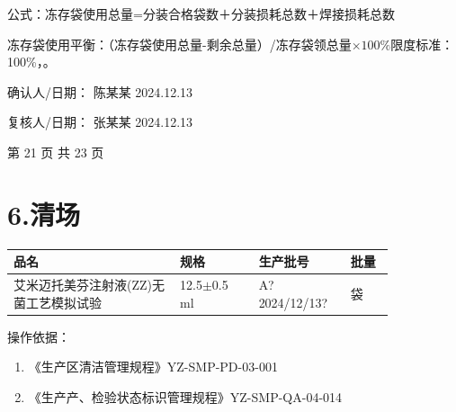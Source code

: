 \documentclass[UTF8,10pt,a4paper,fontset=fandol]{ctexart}
\newcommand{\fieldvalue}[1]{#1}
\newcommand{\handwritten}[1]{#1}
\begin{document}
公式：冻存袋使用总量=分装合格袋数＋分装损耗总数＋焊接损耗总数

冻存袋使用平衡：（冻存袋使用总量-剩余总量）/冻存袋领总量$\times 100\%$\qquad 限度标准：100\%，。

确认人/日期：
\fieldvalue{\handwritten{陈某某}}
\qquad
\fieldvalue{\handwritten{2024.12.13}}

\medskip

复核人/日期：
\fieldvalue{\handwritten{张某某}}
\qquad
\fieldvalue{\handwritten{2024.12.13}}

\begin{center}
第 21 页 共 23 页
\end{center}

\newpage

\section*{6.\quad 清场}

\begin{tabular}{|p{0.38\linewidth}|p{0.18\linewidth}|p{0.18\linewidth}|p{0.10\linewidth}|}
\hline
\centering 品名 & \centering 规格 & \centering 生产批号 & \centering 批量\\
\hline
\fieldvalue{艾米迈托美芬注射液(ZZ)无菌工艺模拟试验}
&
\fieldvalue{12.5$\pm$0.5 ml}
&
\fieldvalue{\handwritten{A?2024/12/13?}}
&
袋\\
\hline
\end{tabular}

\vspace{0.5em}

操作依据：

\begin{enumerate}
  \item 《生产区清洁管理规程》\hfill YZ-SMP-PD-03-001
  \item 《生产产、检验状态标识管理规程》\hfill YZ-SMP-QA-04-014
\end{enumerate}
\end{document}
